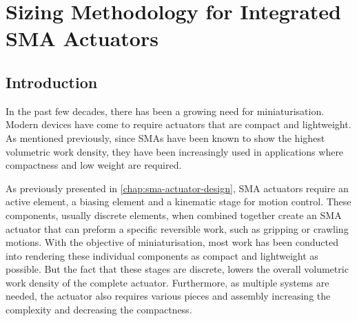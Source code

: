 
\chapter{Sizing Methodology for Integrated SMA Actuators}\label{chap:design-methodology}


\section{Introduction}
In the past few decades, there has been a growing need for miniaturisation. Modern devices have come to require actuators that are compact and lightweight. As mentioned previously, since SMAs have been known to show the highest volumetric work density, they have been increasingly used in applications where compactness and low weight are required.

As previously presented in \cref{chap:sma-actuator-design}, SMA actuators require an active element, a biasing element and a kinematic stage for motion control. These components, usually discrete elements, when combined together create an SMA actuator that can preform a specific reversible work, such as gripping or crawling motions\todocite. With the objective of miniaturisation, most work has been conducted into rendering these individual components as compact and lightweight as possible\todocite. But the fact that these stages are discrete, lowers the overall volumetric work density of the complete actuator. Furthermore, as multiple systems are needed, the actuator also requires various pieces and assembly increasing the complexity and decreasing the compactness.


